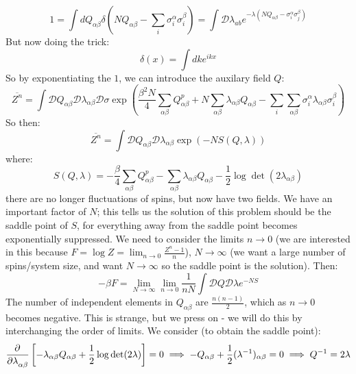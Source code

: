 \begin{equation}
    1 = \int dQ_{\alpha\beta}\delta(NQ_{\alpha\beta} - \sum_i \sigma_i^\alpha \sigma_i^\beta) = \int \mathcal{D}\lambda_{ab}e^{-\lambda(NQ_{\alpha\beta} - \sigma_i^\alpha\sigma_j^\beta)}
\end{equation}
But now doing the trick:
\begin{equation}
    \delta(x) = \int dk e^{ikx}
\end{equation}
So by exponentiating the $1$, we can introduce the auxilary field $Q$:
\begin{equation}
    \overline{Z^n} = \int \mathcal{D}Q_{\alpha\beta}\mathcal{D}\lambda_{\alpha\beta}\mathcal{D}\sigma \exp(\frac{\beta^2 N}{4}\sum_{\alpha\beta}Q^p_{\alpha\beta} + N\sum_{\alpha\beta}\lambda_{\alpha\beta}Q_{\alpha\beta} - \sum_i \sum_{\alpha\beta}\sigma_i^\alpha \lambda_{\alpha\beta}\sigma_i^\beta)
\end{equation}
So then:
\begin{equation}
    \overline{Z^n} = \int \mathcal{D}Q_{\alpha\beta}\mathcal{D}\lambda_{\alpha\beta}\exp(-NS(Q, \lambda))
\end{equation}
where:
\begin{equation}
    S(Q, \lambda) = - \frac{\beta}{4}\sum_{\alpha\beta}Q_{\alpha\beta}^p - \sum_{\alpha\beta}\lambda_{\alpha\beta}Q_{\alpha\beta} - \frac{1}{2}\log\det(2\lambda_{\alpha\beta})
\end{equation}
there are no longer fluctuations of spins, but now have two fields. We have an important factor of $N$; this tells us the solution of this problem should be the saddle point of $S$, for everything away from the saddle point becomes exponentially suppressed. We need to consider the limits $n \to 0$ (we are interested in this because $F = \log Z = \lim_{n \to 0}\frac{Z^n - 1}{n}$), $N \to \infty$ (we want a large number of spins/system size, and want $N \to \infty$ so the saddle point is the solution). Then:
\begin{equation}
    -\beta F = \lim_{N \to \infty}\lim_{n \to 0}\frac{1}{nN}\int \mathcal{D}Q\mathcal{D}\lambda e^{-NS}
\end{equation}
The number of independent elements in $Q_{\alpha\beta}$ are $\frac{n(n-1)}{2}$, which as $n \to 0$ becomes negative. This is strange, but we press on - we will do this by interchanging the order of limits. We consider (to obtain the saddle point):
\begin{equation}
    \dpd{}{\lambda_{\alpha\beta}}\left[-\lambda_{\alpha\beta}Q_{\alpha\beta} + \frac{1}{2}\log \det(2\lambda)\right] = 0 \implies -Q_{\alpha\beta} + \frac{1}{2}(\lambda^{-1})_{\alpha\beta} = 0 \implies Q^{-1} = 2\lambda
\end{equation}
